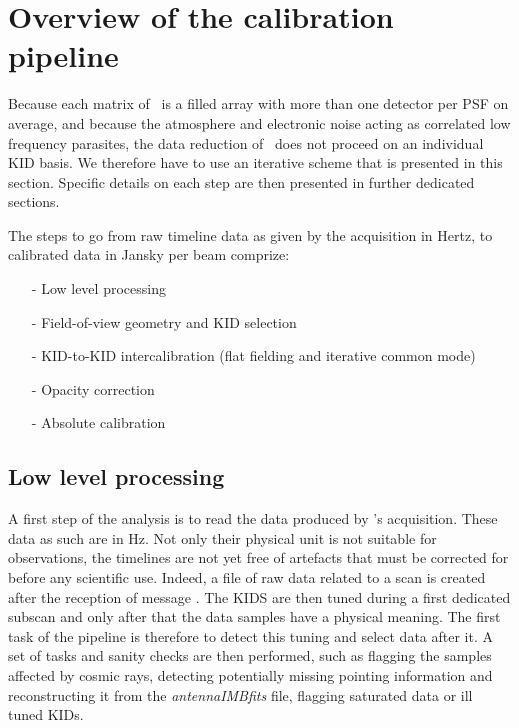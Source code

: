 \section{Overview of the calibration pipeline}

Because each matrix of \nika\ is a filled array with more than one detector per
PSF on average, and because the atmosphere and electronic noise acting as
correlated low frequency parasites, the data reduction of \nika\ does not
proceed on an individual KID basis. We therefore have to use an iterative scheme
that is presented in this section. Specific details on each step are then
presented in further dedicated sections.


The steps to go from raw timeline data as given by the acquisition in Hertz, to
calibrated data in Jansky per beam comprize:

\begin{itemize}
\item[-] Low level processing
\item[-] Field-of-view geometry and KID selection
\item[-] KID-to-KID intercalibration (flat fielding and iterative common mode)
\item[-] Opacity correction
\item[-] Absolute calibration
\end{itemize}

\subsection{Low level processing}

A first step of the analysis is to read the data produced by \nika's
acquisition. These data as such are in Hz. Not only their physical unit is not
suitable for observations, the timelines are not yet free of artefacts that must
be corrected for before any scientific use. Indeed, a file of raw data related
to a scan is created after the reception of message . The KIDS are then tuned during a first
dedicated subscan and only after that the data samples have a physical
meaning. The first task of the pipeline is therefore to detect this tuning and
select data after it. A set of tasks and sanity checks are then performed, such
as flagging the samples affected by cosmic rays, detecting potentially missing
pointing information and reconstructing it from the \emph{antennaIMBfits} file,
flagging saturated data or ill tuned KIDs.\\

